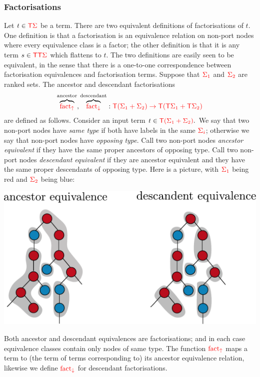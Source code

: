 \subsubsection{Factorisations}
    Let $t \in {\color{red}{\mathsf T}} {\color{red}{\Sigma}}$ be a term. 
    There are two equivalent definitions of factorisations of $t$. One definition is that a factorisation is an equivalence relation on non-port nodes where every equivalence class is a factor; the other definition is that it is any term $s  \in {\color{red}{\mathsf T}} {\color{red}{\mathsf T}} {\color{red}{\Sigma}}$ which flattens to $t$. 
    The two definitions are easily seen to be equivalent, in the sense that there is a one-to-one correspondence between factorisation equivalences and factorisation terms.
    Suppose that ${\color{red}{\Sigma_1}}$ and ${\color{red}{\Sigma_2}}$ are ranked sets. The ancestor and descendant factorisations 
        \begin{align*}
            \overbrace{{\color{red}{\mathrm{fact_{\uparrow}}}}}^{\text{ancestor}}, \overbrace{{\color{red}{\mathrm{fact_{\downarrow}}}}}^{\text{descendant}}  : {\color{red}{{\color{red}{\mathsf T}}(\Sigma_1+\Sigma_2) \to {\color{red}{\mathsf T}}({\color{red}{\mathsf T}}\Sigma_1 + {\color{red}{\mathsf T}}\Sigma_2)}}
        \end{align*}
        are defined as follows. Consider an input term
            $t \in {\color{red}{{\color{red}{\mathsf T}}(\Sigma_1+\Sigma_2)}}.$
        We say that two non-port nodes have \emph{same type} if both have labels in the same  ${\color{red}{\Sigma_i}}$; otherwise we say that non-port nodes have \emph{opposing type}.  Call two non-port nodes \emph{ancestor equivalent}  if they have the same proper ancestors of opposing type. Call two non-port nodes \emph{descendant equivalent}  if they  are ancestor equivalent and they have the same proper descendants of opposing type. Here is a picture, with ${\color{red}{\Sigma_1}}$ being red and ${\color{red}{\Sigma_2}}$ being blue: 
        \begin{center}
      \includegraphics[scale=.3]{facto-up-down.pdf}
        \end{center}
        Both ancestor and descendant equivalences are factorisations; and in each case equivalence classes contain only nodes of same type.  The function ${\color{red}{\mathrm{fact_{\uparrow}}}}$ maps a term to (the term of terms corresponding to) its ancestor equivalence relation, likewise we define ${\color{red}{\mathrm{fact_{\downarrow}}}}$ for  descendant factorisations.
    
